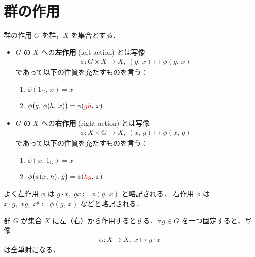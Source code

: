 \documentclass[geometry_main]{subfiles}
\begin{document}
\section{群の作用}

\begin{mydef}[label=def.group_action]{群の作用}
	$G$ を群，$X$ を集合とする．
	\begin{itemize}
		\item  $G$ の $X$ への\textbf{左作用} (left action) とは写像
		\begin{align}
			\phi \colon G \times X \to X,\; (g,\, x) \mapsto \phi(g,\, x)
		\end{align}
		であって以下の性質を充たすものを言う：
		\begin{enumerate}
			\item $\phi(1_G,\, x) = x$
			\item $\phi\bigl(g,\, \phi(h,\, x)\bigr) = \phi(\textcolor{red}{gh},\, x)$
		\end{enumerate}
		\item $G$ の $X$ への\textbf{右作用} (right action) とは写像
		\begin{align}
			\phi \colon X \times G \to X,\; (x,\, g) \mapsto \phi(x,\, g)
		\end{align}
		であって以下の性質を充たすものを言う：
		\begin{enumerate}
			\item $\phi(x,\, 1_G) = x$
			\item $\phi\bigl(\phi(x,\, h),\, g\bigr) = \phi(\textcolor{red}{hg},\, x)$
		\end{enumerate}
	\end{itemize}
\end{mydef}

\begin{marker}
	よく左作用 $\phi$ は $g \cdot x,\; gx \coloneqq \phi(g,\, x)$ と略記される．
	右作用 $\phi$ は $x \cdot g,\; xg,\; x^g \coloneqq \phi(g,\, x)$ などと略記される．
\end{marker}

\begin{myprop}[]{}
	群 $G$ が集合 $X$ に左（右）から作用するとする．$\forall g \in G$ を一つ固定すると，写像
	\begin{align}
		\alpha \colon X \to X,\; x \mapsto g \cdot x
	\end{align}
	は全単射になる．
\end{myprop}
\end{document}
